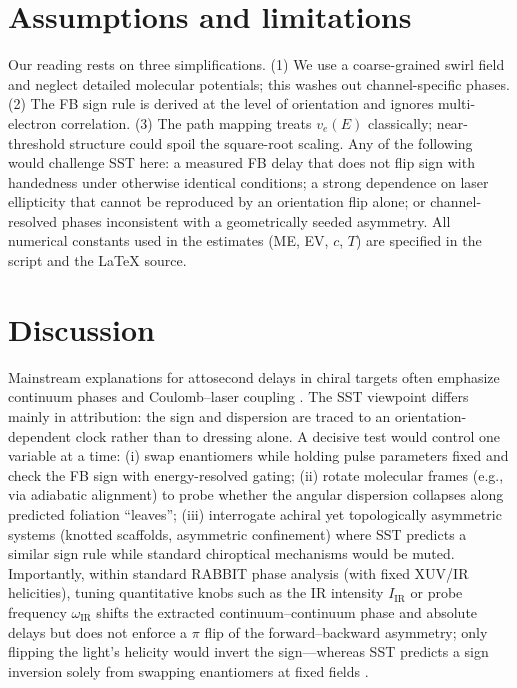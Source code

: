 \documentclass[reprint, aps, prl, longbibliography]{revtex4-2}
\begin{document}
\section{Assumptions and limitations}
Our reading rests on three simplifications.
(1) We use a coarse-grained swirl field and neglect detailed molecular potentials; this washes out channel-specific phases.
(2) The FB sign rule is derived at the level of orientation and ignores multi-electron correlation.
(3) The path mapping treats $v_e(E)$ classically; near-threshold structure could spoil the square-root scaling.
Any of the following would challenge SST here: a measured FB delay that does not flip sign with handedness under otherwise identical conditions; a strong dependence on laser ellipticity that cannot be reproduced by an orientation flip alone; or channel-resolved phases inconsistent with a geometrically seeded asymmetry.
All numerical constants used in the estimates (ME, EV, $c$, $T$) are specified in the script and the \LaTeX{} source.


\section{Discussion}
Mainstream explanations for attosecond delays in chiral targets often emphasize continuum phases and Coulomb–laser coupling \cite{Demekhin2018}. The SST viewpoint differs mainly in attribution: the sign and dispersion are traced to an orientation-dependent clock rather than to dressing alone. A decisive test would control one variable at a time:
(i) swap enantiomers while holding pulse parameters fixed and check the FB sign with energy-resolved gating;
(ii) rotate molecular frames (e.g., via adiabatic alignment) to probe whether the angular dispersion collapses along predicted foliation “leaves”;
(iii) interrogate achiral yet topologically asymmetric systems (knotted scaffolds, asymmetric confinement) where SST predicts a similar sign rule while standard chiroptical mechanisms would be muted.
Importantly, within standard RABBIT phase analysis (with fixed XUV/IR helicities), tuning quantitative knobs such as the IR intensity $I_{\mathrm{IR}}$ or probe frequency $\omega_{\mathrm{IR}}$ shifts the extracted continuum–continuum phase and absolute delays but does not enforce a $\pi$ flip of the forward–backward asymmetry; only flipping the light’s helicity would invert the sign—whereas SST predicts a sign inversion solely from swapping enantiomers at fixed fields \cite{Dahlstrom2012,Pazourek2015,Demekhin2018}.
\end{document}
